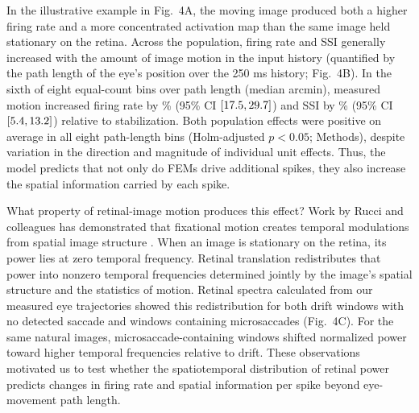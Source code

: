 \documentclass{lite}
\begin{document}
In the illustrative example in Fig.~4A, the moving image produced both a higher firing rate and a more concentrated activation map than the same image held stationary on the retina. Across the population, firing rate and SSI generally increased with the amount of image motion in the input history (quantified by the path length of the eye's position over the 250 ms history; Fig.~4B). In the sixth of eight equal-count bins over path length (median \FigFourPath{} arcmin), measured motion increased firing rate by \FigFourRateEffect\% (95\% CI $[17.5, 29.7]$) and SSI by \FigFourSSIEffect\% (95\% CI $[5.4, 13.2]$) relative to stabilization. Both population effects were positive on average in all eight path-length bins (Holm-adjusted $p<0.05$; Methods), despite variation in the direction and magnitude of individual unit effects. Thus, the model predicts that not only do FEMs drive additional spikes, they also increase the spatial information carried by each spike.

What property of retinal-image motion produces this effect? Work by Rucci and colleagues has demonstrated that fixational motion creates temporal modulations from spatial image structure \cite{rucci2015unsteady,kuang2012temporal}. When an image is stationary on the retina, its power lies at zero temporal frequency. Retinal translation redistributes that power into nonzero temporal frequencies determined jointly by the image's spatial structure and the statistics of motion. Retinal spectra calculated from our measured eye trajectories showed this redistribution for both drift windows with no detected saccade and windows containing microsaccades (Fig.~4C). For the same natural images, microsaccade-containing windows shifted normalized power toward higher temporal frequencies relative to drift. These observations motivated us to test whether the spatiotemporal distribution of retinal power predicts changes in firing rate and spatial information per spike beyond eye-movement path length.

\end{document}
